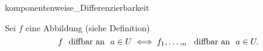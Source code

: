 \documentclass[class=article, crop=false]{standalone}
\begin{document}
\begin{zettel}{komponentenweise_Differenzierbarkeit}
\begin{flashcard}
\begin{lemma}
    Sei $f$ eine Abbildung (siehe Definition)
\[
f \tx{ diffbar an } a \in  U \iff f_1,\dots,_n \tx{ diffbar an  } a \in  U
.\]
\end{lemma}


\end{flashcard}
\end{zettel}
\end{document}
